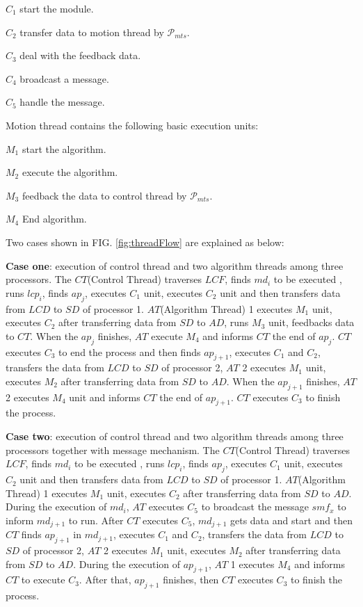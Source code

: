 \documentclass[journal,UTF8]{IEEEtran}
\begin{document}
 \textbf{$C_{1}$} start the module.
 
 \textbf{$C_{2}$} transfer data to motion thread by $\mathcal{P}_{mts}$.
 
 \textbf{$C_{3}$} deal with the feedback data.
 
 \textbf{$C_{4}$} broadcast a message.
 
  \textbf{$C_{5}$} handle the message.
  
 Motion thread contains the following basic execution units:
 
 \textbf{$M_{1}$} start the algorithm.
 
 \textbf{$M_{2}$} execute the algorithm.
 
 \textbf{$M_{3}$} feedback the data to control thread by $\mathcal{P}_{mts}$.
 
 \textbf{$M_{4}$} End algorithm.
  
  Two cases shown in FIG. \ref{fig:threadFlow} are explained as below:
  
  \textbf{Case one}: execution of control thread and two algorithm threads among three processors. The $CT$(Control Thread) traverses $LCF$, finds $md_i$ to be executed , runs $lcp_i$, finds $ap_j$, executes $C_1$ unit, executes $C_2$ unit and then transfers data from $LCD$ to $SD$ of processor 1. $AT$(Algorithm Thread) 1 executes $M_1$ unit, executes $C_2$ after transferring data from $SD$ to $AD$, runs $M_3$ unit, feedbacks data to $CT$. When the $ap_j$ finishes, $AT$ execute $M_4$ and informs $CT$ the end of $ap_j$. $CT$ executes $C_3$ to end the process and then finds $ap_{j+1}$, executes $C_1$ and $C_2$, transfers the data from $LCD$ to $SD$ of processor 2, $AT$ 2 executes $M_1$ unit, executes $M_2$ after transferring data from $SD$ to $AD$. When the $ap_{j+1}$ finishes, $AT$ 2 executes $M_4$ unit and informs $CT$ the end of $ap_{j+1}$. $CT$ executes $C_3$ to finish the process.
  
  \textbf{Case two}: execution of control thread and two algorithm threads among three processors together with message mechanism. The $CT$(Control Thread) traverses $LCF$, finds $md_i$ to be executed , runs $lcp_i$, finds $ap_j$, executes $C_1$ unit, executes $C_2$ unit and then transfers data from $LCD$ to $SD$ of processor 1. $AT$(Algorithm Thread) 1 executes $M_1$ unit, executes $C_2$ after transferring data from $SD$ to $AD$. During the execution of $md_i$, $AT$ executes $C_5$ to broadcast the message $smf_x$ to inform $md_{j+1}$ to run. After $CT$ executes $C_5$, $md_{j+1}$ gets data and start and then $CT$ finds $ap_{j+1}$ in $md_{j+1}$, executes $C_1$ and $C_2$, transfers the data from $LCD$ to $SD$ of processor 2, $AT$ 2 executes $M_1$ unit, executes $M_2$ after transferring data from $SD$ to $AD$. During the execution of $ap_{j+1}$, $AT$ 1 executes $M_4$ and informs $CT$ to execute $C_3$. After that, $ap_{j+1}$ finishes, then $CT$ executes $C_3$ to finish the process.
  
\end{document}
